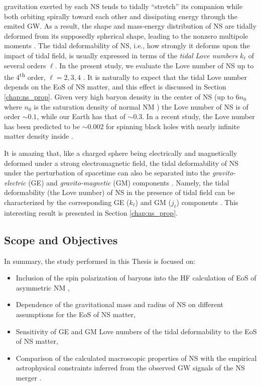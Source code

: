 gravitation exerted by each \gls{NS} tends to tidally ``stretch'' its companion while 
both orbiting spirally toward each other and dissipating energy through the emited 
\gls{GW}. As a result, the shape and mass-energy
distribution of \gls{NS} are tidally deformed from its supposedly spherical shape, 
leading to the nonzero multipole moments 
\citep{hinderer2008tidal,hinderer2010tidal,damour2009relativistic}. The tidal 
deformability of \gls{NS}, i.e., how strongly it deforms upon the impact of tidal field, 
is usually expressed in terms of the \emph{tidal Love numbers} $k_\ell$ of several orders 
$\ell$. In the present study, we evaluate the Love number of \gls{NS} 
up to the 4\textsuperscript{th} order, $\ell=2,3,4$ \citep{perot2021role}. It is naturally
to expect that the tidal Love number depends on the \gls{EoS} of NS matter, and this 
effect is discussed in Section \ref{chap:ns_prop}. Given very high baryon density in the
center of \gls{NS} (up to $6n_0$ where $n_0$ is the saturation density of normal NM ) 
the Love number of NS is of order $\sim 0.1$, while our Earth has that of $\sim 0.3$. 
In a recent study, the Love number has been predicted to be $\sim 0.002$ for spinning 
black holes with nearly infinite matter density inside \citep{le2021spinning}.

It is amazing that, like a charged sphere being electrically and magnetically deformed 
under a strong electromagnetic field, the tidal deformability of NS under the perturbation 
of spacetime can also be separated into the \emph{gravito-electric} (\gls{GE}) 
and \emph{gravito-magnetic} (\gls{GM}) components \citep{damour2009relativistic}. 
Namely, the tidal deformability (the Love number) of \gls{NS}  in the presence of tidal 
field can be characterized by the corresponding \gls{GE} ($k_\ell$) and \gls{GM} ($j_\ell$) 
components \citep{perot2021role}. This interesting result is presented in 
Section \ref{chap:ns_prop}.

\subsection*{Scope and Objectives}%
\label{sec:scope_and_objectives}

In summary, the study performed in this Thesis is focused on:
\begin{itemize}
        \item Inclusion of the spin polarization of baryons into the HF calculation
				of EoS of asymmetric NM \citep{tan2021equation},
        \item Dependence of the gravitational mass and radius of \gls{NS} on 
				different assumptions for the \gls{EoS} of NS matter,
        \item Sensitivity of \gls{GE} and \gls{GM} Love numbers of the tidal deformability 
				to the EoS of NS matter,
        \item Comparison of the calculated macroscopic properties of NS with the empirical
				astrophysical constraints inferred from the observed GW signals of the NS merger 
				\citep{abbott2018gw170817,xie2019bayesian}.
\end{itemize}
